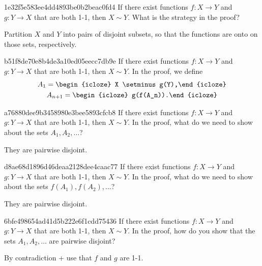\begin{note}{1e32f5e583ee4dd4893be0b2beac0fd4}
    If there exist functions \({ f : X \to Y }\) and \({ g : Y \to X }\) that are both 1-1, then \({ X \sim Y }\).
    What is the strategy in the proof?

    \begin{cloze}{1}
        Partition \({ X }\) and \({ Y }\) into pairs of disjoint subsets, so that the functions are onto on those sets, respectively.
    \end{cloze}
\end{note}

\begin{note}{b51f8de70e8b4de3a10ed05eecc7db9e}
    If there exist functions \({ f : X \to Y }\) and \({ g : Y \to X }\) that are both 1-1, then \({ X \sim Y }\).
    In the proof, we define
    \[
        \begin{gathered}
            A_1 = \begin{icloze}{1}X \setminus g(Y),\end{icloze} \\
            A_{n+1} = \begin{icloze}{2}g(f(A_n)).\end{icloze}
        \end{gathered}
    \]
\end{note}

\begin{note}{a76880dee9b3458980e3bee5893cfcb8}
    If there exist functions \({ f : X \to Y }\) and \({ g : Y \to X }\) that are both 1-1, then \({ X \sim Y }\).
    In the proof, what do we need to show about the sets \({ A_1, A_2, \ldots }\)?

    \begin{cloze}{1}
        They are pairwise disjoint.
    \end{cloze}
\end{note}

\begin{note}{d8ae68d1896d46deaa2128dee4caac77}
    If there exist functions \({ f : X \to Y }\) and \({ g : Y \to X }\) that are both 1-1, then \({ X \sim Y }\).
    In the proof, what do we need to show about the sets \({ f(A_1), f(A_2), \ldots }\)?

    \begin{cloze}{1}
        They are pairwise disjoint.
    \end{cloze}
\end{note}

\begin{note}{6bfe498654ad41d5b222e6f1cdd75436}
    If there exist functions \({ f : X \to Y }\) and \({ g : Y \to X }\) that are both 1-1, then \({ X \sim Y }\).
    In the proof, how do you show that the sets \({ A_1, A_2, \ldots }\) are pairwise disjoint?

    \begin{cloze}{1}
        By contradiction + use that \({ f }\) and \({ g }\) are 1-1.
    \end{cloze}
\end{note}

